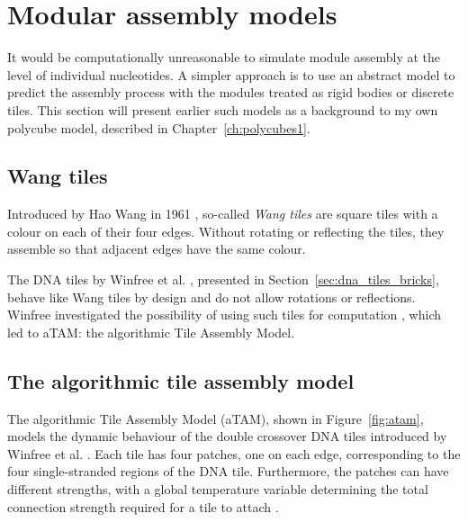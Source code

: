 \section{Modular assembly models}
It would be computationally unreasonable to simulate module assembly at the level of individual nucleotides. A simpler approach is to use an abstract model to predict the assembly process with the modules treated as rigid bodies or discrete tiles. This section will present earlier such models as a background to my own polycube model, described in Chapter~\ref{ch:polycubes1}.

\subsection{Wang tiles}
Introduced by Hao Wang in 1961 \cite{wang1961proving}, so-called \emph{Wang tiles} are square tiles with a colour on each of their four edges. Without rotating or reflecting the tiles, they assemble so that adjacent edges have the same colour.


The DNA tiles by Winfree et al. \cite{winfree1998design}, presented in Section~\ref{sec:dna_tiles_bricks}, behave like Wang tiles by design and do not allow rotations or reflections. Winfree investigated the possibility of using such tiles for computation \cite{winfree1998algorithmic}, which led to aTAM: the algorithmic Tile Assembly Model.

\subsection{The algorithmic tile assembly model}
\label{sec:atam}


The algorithmic Tile Assembly Model (aTAM), shown in Figure~\ref{fig:atam}, models the dynamic behaviour of the double crossover DNA tiles introduced by Winfree et al. \cite{winfree1998design}. Each tile has four patches, one on each edge, corresponding to the four single-stranded regions of the DNA tile. Furthermore, the patches can have different strengths, with a global temperature variable determining the total connection strength required for a tile to attach \cite{doty2012theory}.

